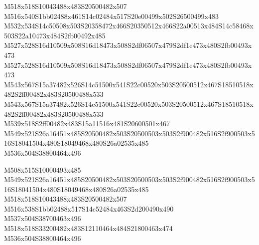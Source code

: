 \documentclass{article}
\begin{document}
\begin{multicols}{5}
\begin{center}
M518x518S10043488x483S20500482x507 %
\\M516x540S1bb02488x461S14c02484x517S20e00499x502S26500499x483 %
\\M532x534S14c50508x503S20358472x466S20350512x466S22a00513x484S14c58468x503S22a10473x484S2fb00492x485 %
\\M527x528S16d10509x508S16d18473x508S2df06507x479S2df1e473x480S2fb00493x473 %
\\M527x528S16d10509x508S16d18473x508S2df06507x479S2df1e473x480S2fb00493x473 %
\\M543x567S15a37482x526S14c51500x541S22c00520x503S20500512x467S18510518x482S2ff00482x483S20500488x533 %
\\M543x567S15a37482x526S14c51500x541S22c00520x503S20500512x467S18510518x482S2ff00482x483S20500488x533 %
\\M539x518S2ff00482x483S15a11516x481S20600501x467 %
\\M549x521S26a16451x485S20500482x503S20500503x503S2f900482x516S2f900503x516S18041504x480S18049468x480S26a02535x485 %
\\M536x504S38800464x496 %

M508x515S10000493x485 %
\\M549x521S26a16451x485S20500482x503S20500503x503S2f900482x516S2f900503x516S18041504x480S18049468x480S26a02535x485 %
\\M518x518S10043488x483S20500482x507 %
\\M516x538S1bb02488x517S14c52484x463S2d200490x490 %
\\M537x504S38700463x496 %
\\M518x518S33200482x483S12110464x484S21800463x474 %
\\M536x504S38800464x496 %

\end{center}
\end{multicols}
\end{document}
